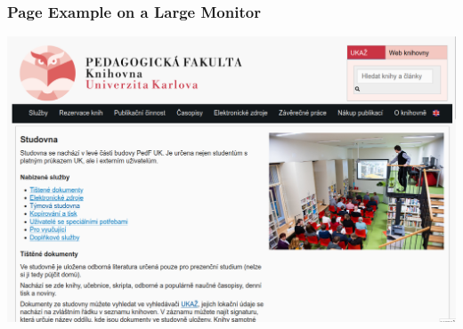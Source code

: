 \begin{frame}
  \frametitle{Page Example on a Large Monitor}
  \begin{center}
    \includegraphics[height=.8\textheight]{img/pedf-web-big.png}
  \end{center}
\end{frame}

